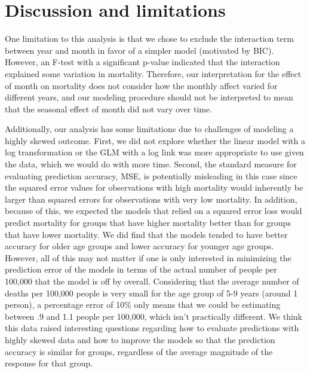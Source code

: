 \documentclass[letterpaper, 11pt]{article}
\begin{document}
\section{Discussion and limitations}

One limitation to this analysis is that we chose to exclude the interaction term between year and month in favor of a simpler model (motivated by BIC). However, an F-test with a significant p-value indicated that the interaction explained some variation in mortality. Therefore, our interpretation for the effect of month on mortality does not consider how the monthly affect varied for different years, and our modeling procedure should not be interpreted to mean that the seasonal effect of month did not vary over time.

Additionally, our analysis has some limitations due to challenges of modeling a highly skewed outcome. First, we did not explore whether the linear model with a log transformation or the GLM with a log link was more appropriate to use given the data, which we would do with more time. Second, the standard measure for evaluating prediction accuracy, MSE, is potentially misleading in this case since the squared error values for observations with high mortality would inherently be larger than squared errors for observations with very low mortality. In addition, because of this, we expected the models that relied on a squared error loss would predict mortality for groups that have higher mortality better than for groups that have lower mortality. We did find that the models tended to have better accuracy for older age groups and lower accuracy for younger age groups.  However, all of this may not matter if one is only interested in minimizing the prediction error of the models in terms of the actual number of people per 100,000 that the model is off by overall. Considering that the average number of deaths per 100,000 people is very small for the age group of 5-9 years (around 1 person), a percentage error of 10\% only means that we could be estimating between .9 and 1.1 people per 100,000, which isn't practically different. We think this data raised interesting questions regarding how to evaluate predictions with highly skewed data and how to improve the models so that the prediction accuracy is similar for groups, regardless of the average magnitude of the response for that group.
\end{document}
